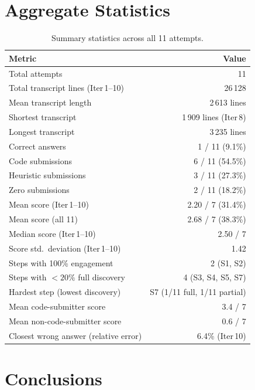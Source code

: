 \documentclass[11pt,a4paper]{article}
\begin{document}
\section{Aggregate Statistics}\label{sec:stats}

\begin{table}[H]
\centering
\caption{Summary statistics across all 11 attempts.}
\label{tab:aggregate}
\begin{tabular}{@{}lr@{}}
\toprule
\textbf{Metric} & \textbf{Value} \\
\midrule
Total attempts & 11 \\
Total transcript lines (Iter\,1--10) & 26\,128 \\
Mean transcript length & 2\,613 lines \\
Shortest transcript & 1\,909 lines (Iter\,8) \\
Longest transcript & 3\,235 lines \\[3pt]
\midrule
Correct answers & 1 / 11 (9.1\%) \\
Code submissions & 6 / 11 (54.5\%) \\
Heuristic submissions & 3 / 11 (27.3\%) \\
Zero submissions & 2 / 11 (18.2\%) \\[3pt]
\midrule
Mean score (Iter\,1--10) & 2.20 / 7 (31.4\%) \\
Mean score (all 11) & 2.68 / 7 (38.3\%) \\
Median score (Iter\,1--10) & 2.50 / 7 \\
Score std.\ deviation (Iter\,1--10) & 1.42 \\[3pt]
\midrule
Steps with 100\% engagement & 2 (S1, S2) \\
Steps with ${<}20\%$ full discovery & 4 (S3, S4, S5, S7) \\
Hardest step (lowest discovery) & S7 (1/11 full, 1/11 partial) \\
Mean code-submitter score & 3.4 / 7 \\
Mean non-code-submitter score & 0.6 / 7 \\
Closest wrong answer (relative error) & 6.4\% (Iter\,10) \\
\bottomrule
\end{tabular}
\end{table}


\section{Conclusions}\label{sec:conclusions}
\end{document}
